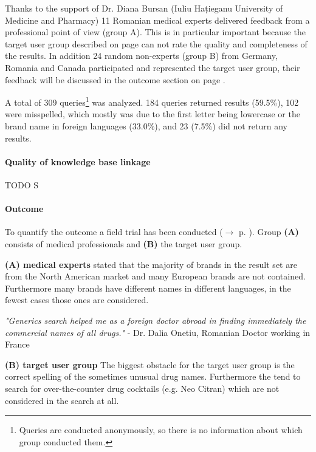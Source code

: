 \documentclass[11pt,titlepage,oneside,openany]{book}
\begin{document}
Thanks to the support of Dr. Diana Bursan (Iuliu Hațieganu University of Medicine and Pharmacy) 11 Romanian medical experts delivered feedback from a professional point of view (group A). This is in particular important because the target user group described on page \pageref{cha:domain} can not rate the quality and completeness of the results.
In addition 24 random non-experts (group B) from Germany, Romania and Canada participated and represented the target user group, their feedback will be discussed in the outcome section on page \pageref{outcome}. 

A total of 309 queries\footnote{Queries are conducted anonymously, so there is no information about which group conducted them.} was analyzed. 184 queries returned results (59.5\%), 102 were misspelled, which mostly was due to the first letter being lowercase or the brand name in foreign languages (33.0\%), and 23 (7.5\%) did not return any results.  

\paragraph{Quality of knowledge base linkage}
\label{cha:example}

TODO S

\paragraph{Outcome}
\label{outcome}
To quantify the outcome a field trial has been conducted ($\rightarrow$ p. \pageref{cha:field_trial}). Group \textbf{(A)} consists of medical professionals and \textbf{(B)} the target user group.

\textbf{(A) medical experts} stated that the majority of brands in the result set are from the North American market and many European brands are not contained. Furthermore many brands have different names in different languages, in the fewest cases those ones are considered.

\textit{"Generics search helped me as a foreign doctor abroad in finding immediately the commercial names of all drugs."} - Dr. Dalia Onetiu, Romanian Doctor working in France

\textbf{(B) target user group} The biggest obstacle for the target user group is the correct spelling of the sometimes unusual drug names. Furthermore the tend to search for over-the-counter drug cocktails (e.g. Neo Citran) which are not considered in the search at all.
\end{document}
